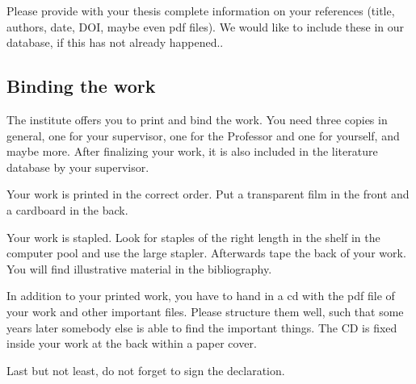 Please provide with your thesis complete information on your references (title, authors, date, DOI, maybe even pdf files). We would like to
include these in our database, if this has not already happened..


\subsection{Binding the work}

The institute offers you to print and bind the work. You need three copies in general, one for your supervisor, one for the Professor and one for yourself, and maybe more. 
After finalizing your work, it is also included in the literature database by your supervisor.

Your work is printed in the correct order. Put a transparent film in the front and a cardboard in the back.

Your work is stapled. Look for staples of the right length in the shelf in the computer pool and use the
large stapler. Afterwards tape the back of your work. You will find illustrative material in the bibliography.

In addition to your printed work, you have to hand in a cd with the pdf file of your work and other important files. 
Please structure them well, such that some years later somebody else is able to find the important things. The CD 
is fixed inside your work at the back within a paper cover.

Last but not least, do not forget to sign the declaration.